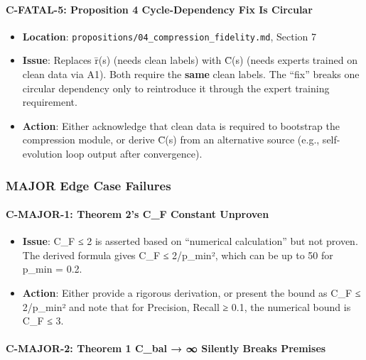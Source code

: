 \documentclass[
  12pt,
]{ctexart}
\providecommand{\tightlist}{%
  \setlength{\itemsep}{0pt}\setlength{\parskip}{0pt}}
\begin{document}
\paragraph{C-FATAL-5: Proposition 4 Cycle-Dependency Fix Is
Circular}\label{c-fatal-5-proposition-4-cycle-dependency-fix-is-circular}

\begin{itemize}
\tightlist
\item
  \textbf{Location}: \texttt{propositions/04\_compression\_fidelity.md},
  Section 7
\item
  \textbf{Issue}: Replaces r̄(s) (needs clean labels) with C̄(s) (needs
  experts trained on clean data via A1). Both require the \textbf{same}
  clean labels. The ``fix'' breaks one circular dependency only to
  reintroduce it through the expert training requirement.
\item
  \textbf{Action}: Either acknowledge that clean data is required to
  bootstrap the compression module, or derive C̄(s) from an alternative
  source (e.g., self-evolution loop output after convergence).
\end{itemize}

\subsubsection{MAJOR Edge Case Failures}\label{major-edge-case-failures}

\paragraph{C-MAJOR-1: Theorem 2's C\_F Constant
Unproven}\label{c-major-1-theorem-2s-c_f-constant-unproven}

\begin{itemize}
\tightlist
\item
  \textbf{Issue}: C\_F ≤ 2 is asserted based on ``numerical
  calculation'' but not proven. The derived formula gives C\_F ≤
  2/p\_min², which can be up to 50 for p\_min = 0.2.
\item
  \textbf{Action}: Either provide a rigorous derivation, or present the
  bound as C\_F ≤ 2/p\_min² and note that for Precision, Recall ≥ 0.1,
  the numerical bound is C\_F ≤ 3.
\end{itemize}

\paragraph{C-MAJOR-2: Theorem 1 C\_bal → ∞ Silently Breaks
Premises}\label{c-major-2-theorem-1-c_bal-silently-breaks-premises}
\end{document}
